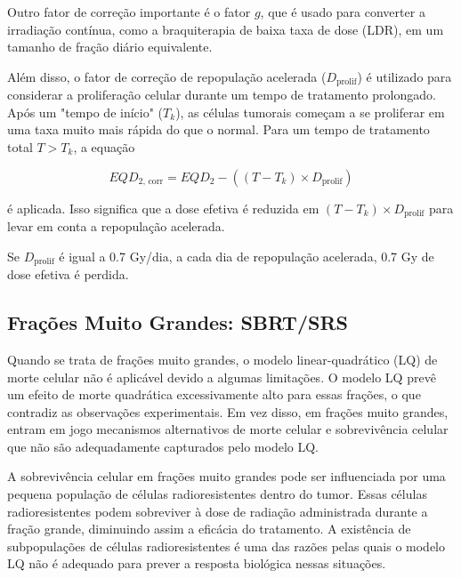 \documentclass[11pt,a4paper]{article}
\begin{document}
	Outro fator de correção importante é o fator $g$, que é usado para converter a irradiação contínua, como a braquiterapia de baixa taxa de dose (LDR), em um tamanho de fração diário equivalente.

	Além disso, o fator de correção de repopulação acelerada ($D_{\text{prolif}}$) é utilizado para considerar a proliferação celular durante um tempo de tratamento prolongado. Após um "tempo de início" ($T_k$), as células tumorais começam a se proliferar em uma taxa muito mais rápida do que o normal. Para um tempo de tratamento total $T > T_k$, a equação  
	
	\begin{equation}
		EQD_{\text{2, corr}} = EQD_2 - ((T - T_k) \times D_{\text{prolif}})
	\end{equation}

	é aplicada. Isso significa que a dose efetiva é reduzida em $(T - T_k) \times D_{\text{prolif}}$ para levar em conta a repopulação acelerada. 

	\begin{tcolorbox}[width=\textwidth, colback={white}, colbacktitle={DarkTurquoise!50!white}, title={$\bigstar$ \LobsterTwo{Exemplo: Correção População Acelerada} $\bigstar$}, coltitle={CarnationPink}, colframe={DarkTurquoise}, fonttitle=\rmfamily\bfseries\Large, breakable]

		Se $D_{\text{prolif}}$ é igual a 0.7 Gy/dia, a cada dia de repopulação acelerada, 0.7 Gy de dose efetiva é perdida.

	\end{tcolorbox}

\subsection*{Frações Muito Grandes: SBRT/SRS}

	Quando se trata de frações muito grandes, o modelo linear-quadrático (LQ) de morte celular não é aplicável devido a algumas limitações. O modelo LQ prevê um efeito de morte quadrática excessivamente alto para essas frações, o que contradiz as observações experimentais. Em vez disso, em frações muito grandes, entram em jogo mecanismos alternativos de morte celular e sobrevivência celular que não são adequadamente capturados pelo modelo LQ.

	A sobrevivência celular em frações muito grandes pode ser influenciada por uma pequena população de células radioresistentes dentro do tumor. Essas células radioresistentes podem sobreviver à dose de radiação administrada durante a fração grande, diminuindo assim a eficácia do tratamento. A existência de subpopulações de células radioresistentes é uma das razões pelas quais o modelo LQ não é adequado para prever a resposta biológica nessas situações.
\end{document}
